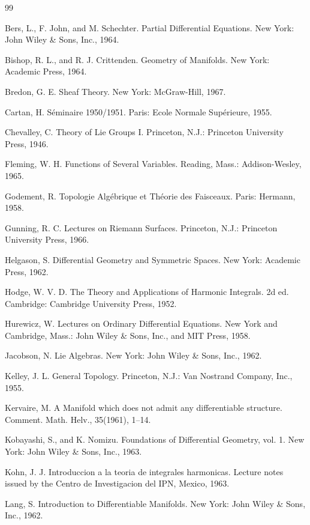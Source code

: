 \begin{thebibliography}{99}
\small
   Bers, L., F. John, and M. Schechter. Partial Differential Equations. New York: John Wiley \& Sons, Inc., 1964.

   Bishop, R. L., and R. J. Crittenden. Geometry of Manifolds. New York: Academic Press, 1964.

   Bredon, G. E. Sheaf Theory. New York: McGraw-Hill, 1967.

   Cartan, H. Séminaire 1950/1951. Paris: Ecole Normale Supérieure, 1955.

   Chevalley, C. Theory of Lie Groups I. Princeton, N.J.: Princeton University Press, 1946.

   Fleming, W. H. Functions of Several Variables. Reading, Mass.: Addison-Wesley, 1965.

   Godement, R. Topologie Algébrique et Théorie des Faisceaux. Paris: Hermann, 1958.

   Gunning, R. C. Lectures on Riemann Surfaces. Princeton, N.J.: Princeton University Press, 1966.

   Helgason, S. Differential Geometry and Symmetric Spaces. New York: Academic Press, 1962.

   Hodge, W. V. D. The Theory and Applications of Harmonic Integrals. 2d ed. Cambridge: Cambridge University Press, 1952.

   Hurewicz, W. Lectures on Ordinary Differential Equations. New York and Cambridge, Mass.: John Wiley \& Sons, Inc., and MIT Press, 1958.

   Jacobson, N. Lie Algebras. New York: John Wiley \& Sons, Inc., 1962.

   Kelley, J. L. General Topology. Princeton, N.J.: Van Nostrand Company, Inc., 1955.

   Kervaire, M. A Manifold which does not admit any differentiable structure. Comment. Math. Helv., 35(1961), 1–14.

   Kobayashi, S., and K. Nomizu. Foundations of Differential Geometry, vol. 1. New York: John Wiley \& Sons, Inc., 1963.

   Kohn, J. J. Introduccion a la teoria de integrales harmonicas. Lecture notes issued by the Centro de Investigacion del IPN, Mexico, 1963.

   Lang, S. Introduction to Differentiable Manifolds. New York: John Wiley \& Sons, Inc., 1962.


\end{thebibliography}
